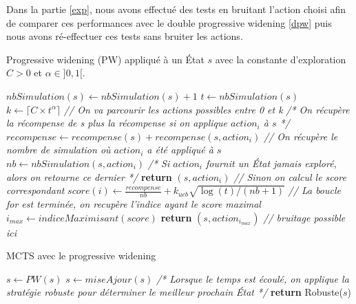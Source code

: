 \documentclass[pdftex,french, english]{article}	%
\begin{document}
       Dans la partie \ref{exp}, nous avons effectué des tests en bruitant l'action choisi afin de comparer ces performances avec le double progressive widening \ref{dpw} puis nous avons ré-effectuer ces tests sans bruiter les actions.
		\begin{algorithm}[H]
			\caption{Progressive widening (PW) appliqué à un État $s$ avec la constante d'exploration $C > 0$ et $\alpha \in ]0, 1[$.}
			\label{alg:spw}
				\begin{algorithmic}[1]
						\State $nbSimulation(s) \gets nbSimulation(s) + 1$ 
						\State $t \gets nbSimulation(s)$
						\State $k \gets \lceil{C \times t^{\alpha}}\rceil$
						\State \textit{// On va parcourir les actions possibles entre 0 et k}
							\State \textit{/* On récupère la récompense de s plus la récompense si on applique $action_{i}$ à $s$ */}
							\State $recompense \gets recompense(s) + recompense(s, action_{i})$
							\State \textit{// On récupère le nombre de simulation où $action_{i}$ a été appliqué à $s$}
							\State $nb \gets nbSimulation(s, action_{i})$
								\State \textit{/* Si $action_{i}$ fournit un État jamais exploré, alors on retourne ce dernier */}
								\State \textbf{return} $(s, action_{i})$
							\Else
								\State \textit{// Sinon on calcul le score correspondant}
								\State $score(i) \gets \frac{recompense}{nb} + \textbf{$k_{ucb}$}\sqrt{\log(t)/(nb + 1)}$							
							\EndIf
						\EndFor
						\State \textit{// La boucle for est terminée, on recupère l'indice ayant le score maximal}
						\State $i_{max} \gets indiceMaximisant(score)$
						\State \textbf{return} $(s, action_{i_{max}})$ \textit{// bruitage possible ici} \label{pw:bruitage}
					\EndFunction
				\end{algorithmic}
		\end{algorithm}

		\begin{algorithm}[H]
			\caption{MCTS avec le progressive widening}
			\label{alg:mctspw}
				\begin{algorithmic}[1]
								\State $s \gets PW(s)$ 
							\EndWhile
						\State $s \gets miseAjour(s)$
						\EndWhile
						\State \textit{/* Lorsque le temps est écoulé, on applique la stratégie robuste pour déterminer le meilleur prochain État */}
					\State \textbf{return} Robuste($s$)
					\EndFunction
				\end{algorithmic}
		\end{algorithm}
\end{document}
